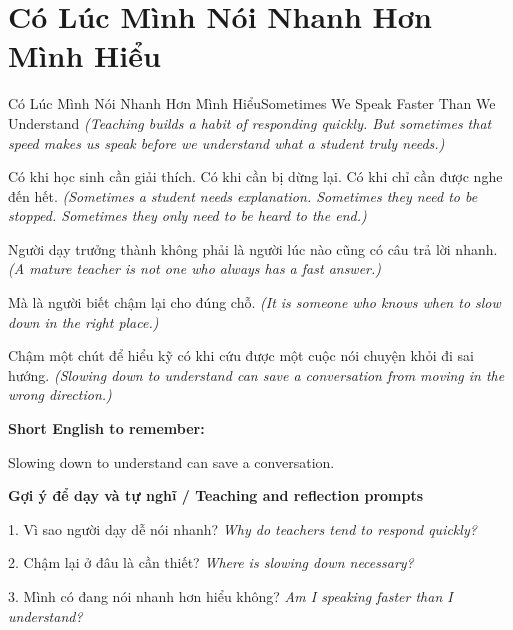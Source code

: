 \section{Có Lúc Mình Nói Nhanh Hơn Mình Hiểu}
\begin{truyen}{Có Lúc Mình Nói Nhanh Hơn Mình Hiểu}{Sometimes We Speak Faster Than We Understand}
\textit{(Teaching builds a habit of responding quickly. But sometimes that speed makes us speak before we understand what a student truly needs.)}

Có khi học sinh cần giải thích. Có khi cần bị dừng lại. Có khi chỉ cần được nghe đến hết.
\textit{(Sometimes a student needs explanation. Sometimes they need to be stopped. Sometimes they only need to be heard to the end.)}

Người dạy trưởng thành không phải là người lúc nào cũng có câu trả lời nhanh.
\textit{(A mature teacher is not one who always has a fast answer.)}

Mà là người biết chậm lại cho đúng chỗ.
\textit{(It is someone who knows when to slow down in the right place.)}

\end{truyen}

\begin{baihoc}
Chậm một chút để hiểu kỹ có khi cứu được một cuộc nói chuyện khỏi đi sai hướng.
\textit{(Slowing down to understand can save a conversation from moving in the wrong direction.)}
\end{baihoc}

\begin{ghinhoanh}
\textbf{Short English to remember:}

Slowing down to understand can save a conversation.

\end{ghinhoanh}

\begin{tuhocnhanh}
\textbf{Gợi ý để dạy và tự nghĩ / Teaching and reflection prompts}

1. Vì sao người dạy dễ nói nhanh? \textit{Why do teachers tend to respond quickly?}

2. Chậm lại ở đâu là cần thiết? \textit{Where is slowing down necessary?}

3. Mình có đang nói nhanh hơn hiểu không? \textit{Am I speaking faster than I understand?}
\end{tuhocnhanh}
\ngancach

